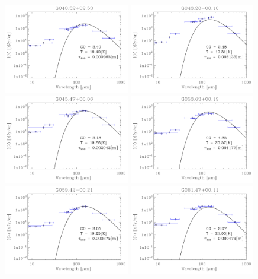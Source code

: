\begin{figure}
\includegraphics[trim=-1mm -1mm -1mm -1mm, clip, width=55mm]{appB/appB_12.pdf}
\includegraphics[trim=-1mm -1mm -1mm -1mm, clip, width=55mm]{appB/appB_13.pdf}
\includegraphics[trim=-1mm -1mm -1mm -1mm, clip, width=55mm]{appB/appB_14.pdf}
\includegraphics[trim=-1mm -1mm -1mm -1mm, clip, width=55mm]{appB/appB_15.pdf}
\includegraphics[trim=-1mm -1mm -1mm -1mm, clip, width=55mm]{appB/appB_16.pdf}
\includegraphics[trim=-1mm -1mm -1mm -1mm, clip, width=55mm]{appB/appB_17.pdf}
\end{figure}

